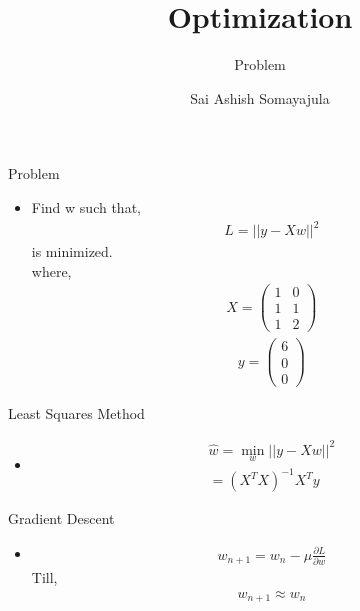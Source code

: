 \documentclass{beamer}
\title{Optimization}
\subtitle{Problem}
\author{Sai Ashish Somayajula\inst{1}}
\institute[Universities of Somewhere and Elsewhere] %
{
  \inst{1}%
  EE16BTECH11043
  }
\begin{document}
\begin{frame}
  \titlepage
\end{frame}




\begin{frame}{Problem}
  \begin{itemize}
  \item {
Find w such that,  \begin{align}
  L = {||y-Xw||}^2
 \end{align} is minimized.
\\where,
 \begin{align}
 X = 
\begin{pmatrix}
		1 & 0 \\ 1 & 1 \\ 1 & 2 
		\end{pmatrix}
 \end{align}
 \begin{align}
  y = \begin{pmatrix}
		6\\0\\0
		\end{pmatrix}
 \end{align}

  }
  \end{itemize}
  
\end{frame}

\begin{frame}{Least Squares Method}
    \begin{itemize}
  \item {
\begin{align}
 \widehat{w} =\min_w {||y-Xw||}^{2}
\\= {(X^{T}X)}^{-1}X^{T}y
 \end{align}  
  

  }
  \end{itemize}
 
\end{frame}

\begin{frame}{Gradient Descent}

\begin{itemize}
  \item {
 \begin{align}
w_{n+1} = w_{n} - \mu \frac{\partial L}{\partial w}
 \end{align}
 Till,
 \begin{align}
  w_{n+1} \approx w_{n}
 \end{align}

  }
 \end{itemize}
  
\end{frame}
\end{document}
